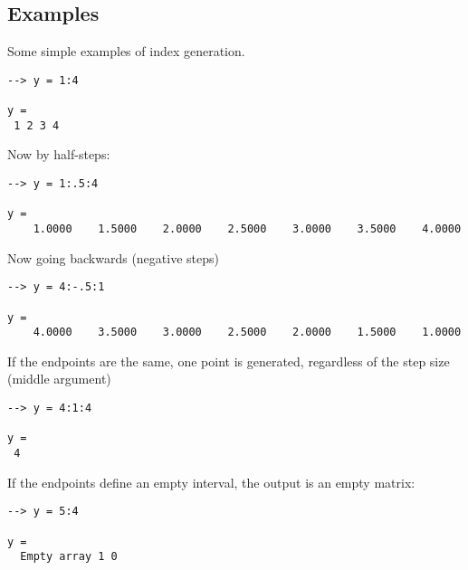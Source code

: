 \subsection{Examples}

Some simple examples of index generation.
\begin{verbatim}
--> y = 1:4

y = 
 1 2 3 4 
\end{verbatim}
Now by half-steps:
\begin{verbatim}
--> y = 1:.5:4

y = 
    1.0000    1.5000    2.0000    2.5000    3.0000    3.5000    4.0000 
\end{verbatim}
Now going backwards (negative steps)
\begin{verbatim}
--> y = 4:-.5:1

y = 
    4.0000    3.5000    3.0000    2.5000    2.0000    1.5000    1.0000 
\end{verbatim}
If the endpoints are the same, one point is generated, regardless of the step size (middle argument)
\begin{verbatim}
--> y = 4:1:4

y = 
 4 
\end{verbatim}
If the endpoints define an empty interval, the output is an empty matrix:
\begin{verbatim}
--> y = 5:4

y = 
  Empty array 1 0
\end{verbatim}

